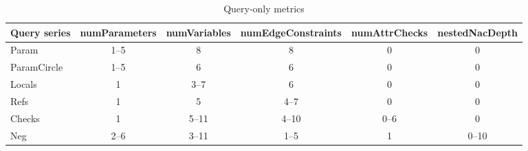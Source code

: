 \begin{table}[Htb]
	\centering
	\footnotesize
	\begin{tabular}{|l|c|c|c|c|c|}
	\hline 
	\textbf{Query series} & \textbf{numParameters} & \textbf{numVariables} &
	\textbf{numEdgeConstraints} & \textbf{numAttrChecks} &
	\textbf{nestedNacDepth}\\ \hline Param & \cellcolor{blue!25}1--5 & 8 & 8 & 0 & 0\\ \hline ParamCircle & \cellcolor{blue!25}1--5 & 6 & 6 & 0 & 0\\ \hline
	Locals & 1 & \cellcolor{blue!25}3--7 & 6 & 0 & 0\\ \hline
	Refs & 1 & 5 & \cellcolor{blue!25}4--7 & 0 & 0\\ \hline
	Checks & 1 & 5--11 & 4--10 & \cellcolor{blue!25}0--6 & 0\\ \hline
	Neg & 2--6 & 3--11 & 1--5 & 1 & \cellcolor{blue!25}0--10\\ \hline
	\end{tabular}
	\caption{Query-only metrics}
	\label{tab:queryonlymetrics}
\end{table}
